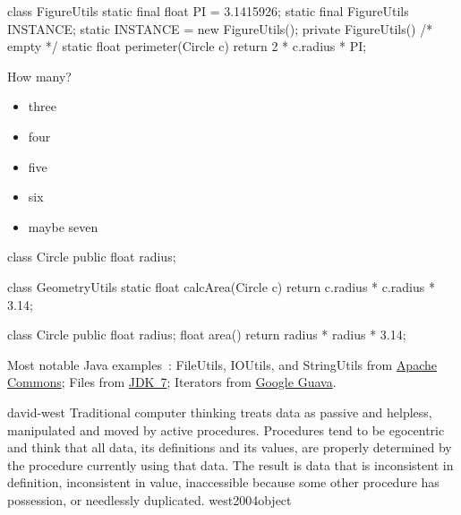 \documentclass{article}
\begin{document}

\pptToc


\begin{pptWide}{2}
{\small\begin{ffcode}
class FigureUtils {
  static final float PI = 3.1415926;
  static final FigureUtils INSTANCE;
  static {
    INSTANCE = new FigureUtils();
  }
  private FigureUtils() { /* empty */ }
  static float perimeter(Circle c) {
    return 2 * c.radius * PI;
  }
}
\end{ffcode}
}
\par\columnbreak\par
How many?
\begin{itemize}
\item three
\item four
\item five
\item six
\item maybe seven
\end{itemize}
\end{pptWide}
\plush{}


\begin{pptWide}{2}
{\small\begin{ffcode}
class Circle {
  public float radius;
}

class GeometryUtils {
  static float calcArea(Circle c) {
    return c.radius * c.radius * 3.14;
  }
}
\end{ffcode}
}
\par\columnbreak\par
{\small\begin{ffcode}
class Circle {
  public float radius;
  float area() {
    return radius * radius * 3.14;
  }
}
\end{ffcode}
}
\end{pptWide}
\par
Most notable Java examples~\citep{bugayenko2015blog0220}:
FileUtils, IOUtils, and StringUtils from
\href{https://commons.apache.org/}{Apache Commons};
Files from \href{https://openjdk.org/projects/jdk7/}{JDK~7};
Iterators from \href{https://github.com/google/guava}{Google Guava}.
\plush{}

\lnQuote
  {david-west}
  {Traditional computer thinking treats data as passive and helpless, manipulated and moved by active procedures. Procedures tend to be egocentric and think that all data, its definitions and its values, are properly determined by the procedure currently using that data. The result is data that is inconsistent in definition, inconsistent in value, inaccessible because some other procedure has possession, or needlessly duplicated.}
  {west2004object}
\end{document}

